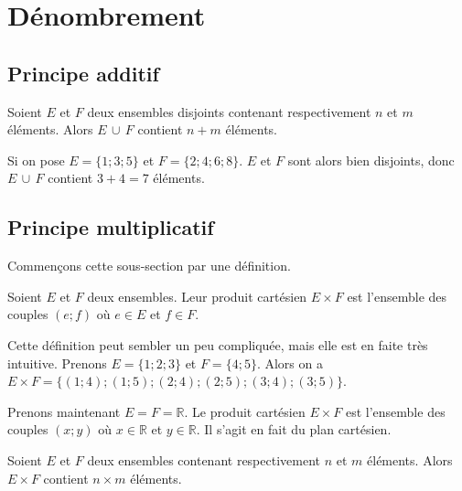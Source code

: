 	\section{Dénombrement}
	
	\subsection{Principe additif}
	
	\begin{formula}
		Soient $E$ et $F$ deux ensembles disjoints contenant respectivement $n$ et $m$ éléments. Alors $E \, \cup \, F$ contient $n + m$ éléments.
	\end{formula}
	
	\begin{tip}[Exemple]
		Si on pose $E = \{1; 3; 5\}$ et $F = \{2; 4; 6; 8\}$. $E$ et $F$ sont alors bien disjoints, donc $E \, \cup \, F$ contient $3 + 4 = 7$ éléments.
	\end{tip}
	
	\subsection{Principe multiplicatif}
	
	Commençons cette sous-section par une définition.
	
	\begin{formula}
		Soient $E$ et $F$ deux ensembles. Leur produit cartésien $E \times F$ est l'ensemble des couples $(e; f)$ où $e \in E$ et $f \in F$.
	\end{formula}
	
	\begin{tip}[Exemple]
		Cette définition peut sembler un peu compliquée, mais elle est en faite très intuitive. Prenons $E = \{1; 2; 3\}$ et $F = \{4; 5\}$.
		\newpar
		Alors on a $E \times F = \{(1; 4); (1; 5); (2; 4); (2; 5); (3; 4); (3; 5)\}$.
	\end{tip}
	
	\begin{tip}
		Prenons maintenant $E = F = \mathbb{R}$. Le produit cartésien $E \times F$ est l'ensemble des couples $(x; y)$ où $x \in \mathbb{R}$ et $y \in \mathbb{R}$.
		\newpar
		Il s'agit en fait du plan cartésien.
	\end{tip}
	
	\begin{formula}
		Soient $E$ et $F$ deux ensembles contenant respectivement $n$ et $m$ éléments. Alors $E \times F$ contient $n \times m$ éléments.
	\end{formula}
	
